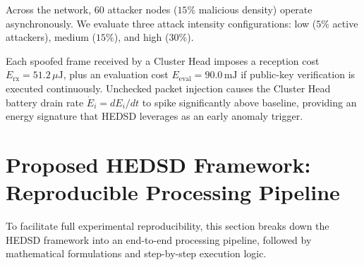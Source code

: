 \documentclass[conference]{IEEEtran}
\begin{document}
Across the network, $60$ attacker nodes ($15\%$ malicious density) operate asynchronously. We evaluate three attack intensity configurations: low ($5\%$ active attackers), medium ($15\%$), and high ($30\%$).

Each spoofed frame received by a Cluster Head imposes a reception cost $E_{\text{rx}} = 51.2\,\mu\text{J}$, plus an evaluation cost $E_{\text{eval}} = 90.0\,\text{mJ}$ if public-key verification is executed continuously. Unchecked packet injection causes the Cluster Head battery drain rate $\dot{E}_i = dE_i/dt$ to spike significantly above baseline, providing an energy signature that HEDSD leverages as an early anomaly trigger.

\section{Proposed HEDSD Framework: Reproducible Processing Pipeline}
\label{sec_methodology}

To facilitate full experimental reproducibility, this section breaks down the HEDSD framework into an end-to-end processing pipeline, followed by mathematical formulations and step-by-step execution logic.
\end{document}
